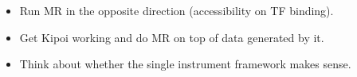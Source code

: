 \begin{Minutes}{}
\maketitle
\listoftasks

\begin{itemize}
    \item Run MR in the opposite direction (accessibility on TF binding).
    \item Get Kipoi working and do MR on top of data generated by it.
    \item Think about whether the single instrument framework makes sense.
\end{itemize}

\task*{}

\end{Minutes}
